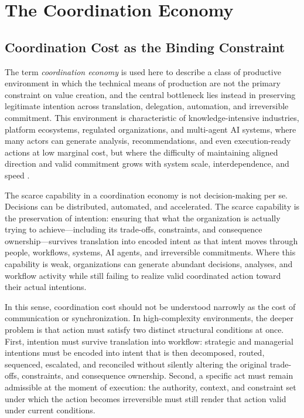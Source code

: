 \documentclass[12pt]{article}
\begin{document}
\section{The Coordination Economy}
\label{sec:coordination}

\subsection{Coordination Cost as the Binding Constraint}

The term \textit{coordination economy} is used here to describe a class of
productive environment in which the technical means of production are not the
primary constraint on value creation, and the central bottleneck lies instead
in preserving legitimate intention across translation, delegation, automation,
and irreversible commitment. This environment is characteristic of
knowledge-intensive industries, platform ecosystems, regulated organizations,
and multi-agent AI systems, where many actors can generate analysis,
recommendations, and even execution-ready actions at low marginal cost, but
where the difficulty of maintaining aligned direction and valid commitment
grows with system scale, interdependence, and speed
\citep{malone1994interdisciplinary, parker2016platform,
puranam2012coordination}.

The scarce capability in a coordination economy is not decision-making per se.
Decisions can be distributed, automated, and accelerated. The scarce
capability is the preservation of intention: ensuring that what the
organization is actually trying to achieve---including its trade-offs,
constraints, and consequence ownership---survives translation into encoded
intent as that intent moves through people, workflows, systems, AI agents, and
irreversible commitments. Where this capability is weak, organizations can
generate abundant decisions, analyses, and workflow activity while still
failing to realize valid coordinated action toward their actual intentions.

In this sense, coordination cost should not be understood narrowly as the cost
of communication or synchronization. In high-complexity environments, the
deeper problem is that action must satisfy two distinct structural conditions
at once. First, intention must survive translation into workflow: strategic and
managerial intentions must be encoded into intent that is then decomposed,
routed, sequenced, escalated, and reconciled without silently altering the
original trade-offs, constraints, and consequence ownership. Second, a
specific act must remain admissible at the moment of execution: the authority,
context, and constraint set under which the action becomes irreversible must
still render that action valid under current conditions.
\end{document}
